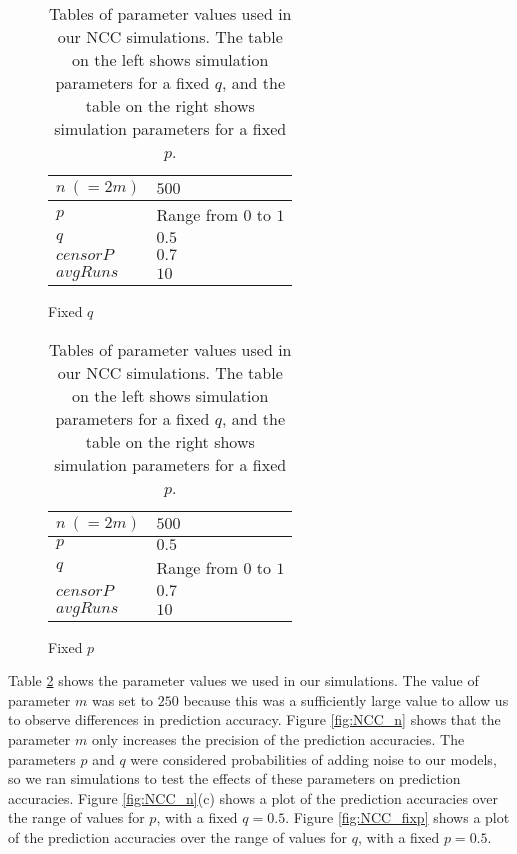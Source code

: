 \begin{table}[H]
\centering
\begin{subfigure}[h]{0.4\linewidth}
\begin{tabular}{|l|l|}
\hline
$n ~(= 2m)$ & $500$ \\ \hline
$p$ & Range from $0$ to $1$\\ \hline
$q$ & $0.5$\\ \hline
$censorP$ & $0.7$\\ \hline
$avgRuns$ & $10$\\ \hline
\end{tabular}
\caption{Fixed $q$}
\end{subfigure}
\hfill
\begin{subfigure}[h]{0.4\linewidth}
\begin{tabular}{|l|l|}
\hline
$n ~(= 2m)$ & $500$ \\ \hline
$p$ & $0.5$\\ \hline
$q$ & Range from $0$ to $1$\\ \hline
$censorP$ & $0.7$\\ \hline
$avgRuns$ & $10$\\ \hline
\end{tabular}
\caption{Fixed $p$}
\end{subfigure}%
\caption{Tables of parameter values used in our NCC simulations. The table
on the left shows simulation parameters for a fixed $q$, and the table on
the right shows simulation parameters for a fixed $p$.}
\label{table:NCC-params}
\end{table}

Table \ref{table:NCC-params} shows the parameter values we used in our
simulations. The value of parameter $m$ was set to $250$ because this was a
sufficiently large value to allow us to observe differences in prediction
accuracy. Figure \ref{fig:NCC_n} shows that the parameter $m$ only
increases the precision of the prediction accuracies. The parameters $p$
and $q$ were considered probabilities of adding noise to our models, so we
ran simulations to test the effects of these parameters on prediction
accuracies. Figure \ref{fig:NCC_n}(c) shows a plot of the prediction
accuracies over the range of values for $p$, with a fixed $q=0.5$. Figure
\ref{fig:NCC_fixp} shows a plot of the prediction accuracies over the range
of values for $q$, with a fixed $p=0.5$.


